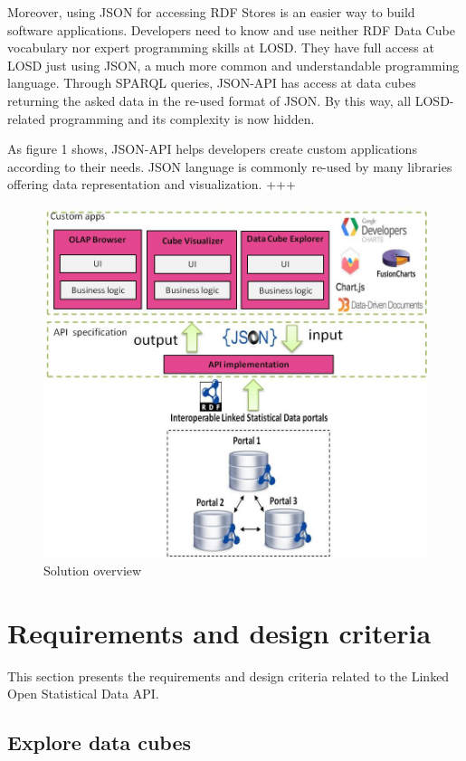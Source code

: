 \documentclass{llncs}
\begin{document}
Moreover, using JSON for accessing RDF Stores is an easier way to build software applications. Developers need to know and use neither RDF Data Cube vocabulary nor expert programming skills at LOSD. They have full access at LOSD just using JSON, a much more common and understandable programming language. Through SPARQL queries, JSON-API has access at data cubes returning the asked data in the re-used format of JSON. By this way, all LOSD-related programming and its complexity is now hidden.

As figure 1 shows, JSON-API helps developers create custom applications according to their needs. JSON language is commonly re-used by many libraries offering data representation and visualization. +++


\begin{figure}
  \includegraphics{images/overview.jpg}
\caption{Solution overview}
\label{fig:overview}
\end{figure}


\section{Requirements and design criteria}\label{sec:reqs}

This section presents the requirements and design criteria related to the Linked Open Statistical Data API.

\subsection{Explore data cubes}
\end{document}
